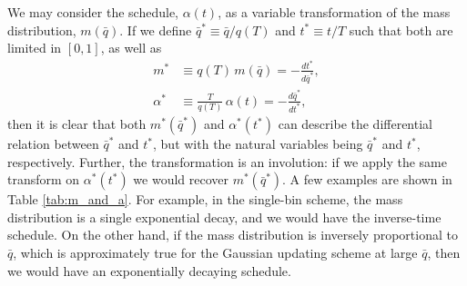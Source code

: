 \documentclass[reprint, superscriptaddress, floatfix]{revtex4-1}
\begin{document}
We may consider the schedule, $\alpha(t)$,
as a variable transformation of
the mass distribution, $m(\bar q)$.
%
If we define
$\bar q^* \equiv \bar q/q(T)$
and $t^* \equiv t/T$
such that both are limited in $[0, 1]$,
as well as
\begin{align*}
  m^*       &\equiv q(T) \, m(\bar q) = -\frac{ dt^* } { d\bar q^* },
  \\
  \alpha^*  &\equiv \frac{T}{q(T)} \, \alpha(t) = -\frac{ d\bar q^* } { dt^* },
\end{align*}
then it is clear that
both $m^*(\bar q^*)$ and $\alpha^*(t^*)$
can describe the differential relation
between $\bar q^*$ and $t^*$,
but with the natural variables
being $\bar q^*$ and $t^*$, respectively.
%
Further, the transformation is an involution:
if we apply the same transform on $\alpha^*(t^*)$
we would recover $m^*(\bar q^*)$.
%
A few examples are shown in Table \ref{tab:m_and_a}.
%
For example, in the single-bin scheme,
the mass distribution is a single exponential decay,
and we would have the inverse-time schedule.
%
On the other hand,
if the mass distribution is inversely proportional to $\bar q$,
which is approximately true for the Gaussian updating scheme
at large $\bar q$,
then we would have an exponentially decaying schedule.
\end{document}
